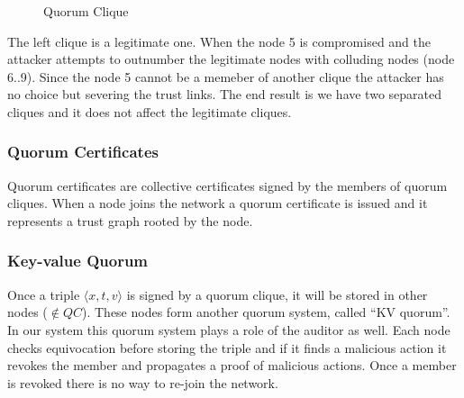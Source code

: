 \documentclass[10pt,fleqn]{article}
\begin{document}
\begin{figure}[h]
\begin{center}
\end{center}
\caption{Quorum Clique}
\end{figure}
The left clique is a legitimate one. When the node 5 is compromised and the attacker attempts to outnumber the legitimate nodes with colluding nodes (node 6..9). Since the node 5 cannot be a memeber of another clique the attacker has no choice but severing the trust links. The end result is we have two separated cliques and it does not affect the legitimate cliques.

\subsubsection*{Quorum Certificates}
Quorum certificates are collective certificates signed by the members of quorum cliques. When a node joins the network a quorum certificate is issued and it represents a trust graph rooted by the node.

\subsubsection*{Key-value Quorum}
Once a triple $\langle x, t, v \rangle$ is signed by a quorum clique, it will be stored in other nodes ($\notin QC$). These nodes form another quorum system, called ``KV quorum''. In our system this quorum system plays a role of the auditor as well. Each node checks equivocation before storing the triple and if it finds a malicious action it revokes the member and propagates a proof of malicious actions. Once a member is revoked there is no way to re-join the network.
\end{document}

